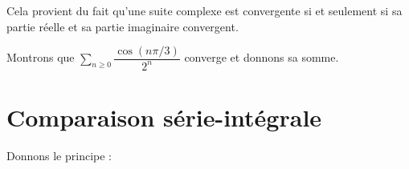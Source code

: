 \documentclass[french,11pt,twoside]{VcCours}
\newcommand{\dx}{\text{d}x}
\newcommand{\Sum}[2]{\ensuremath{\textstyle{\sum\limits_{#1}^{#2}}}}
\begin{document}
\begin{Demonstration}{} 
Cela provient du fait qu'une suite complexe est convergente si et seulement si sa partie réelle et sa partie imaginaire convergent.
\end{Demonstration}

\begin{Exemple} Montrons que $\Sum{n \geq 0}{} \dfrac{\cos(n \pi/3)}{2^n}$ converge et donnons sa somme.

\vspace{9.5cm}
\end{Exemple}

\section{Comparaison série-intégrale}

Donnons le principe :

%
%
%
%
%
%
\end{document}
